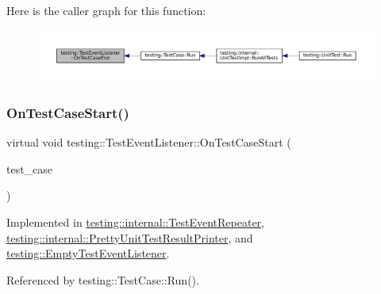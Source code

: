Here is the caller graph for this function\+:
\nopagebreak
\begin{figure}[H]
\begin{center}
\leavevmode
\includegraphics[width=350pt]{classtesting_1_1TestEventListener_ae61985e2ef76ac78379b077be57a9c36_icgraph}
\end{center}
\end{figure}
\mbox{\label{classtesting_1_1TestEventListener_ab4ed885d63f5bbff8076c1329b3dfe36}} 
\subsubsection{\texorpdfstring{On\+Test\+Case\+Start()}{OnTestCaseStart()}}
{\footnotesize\ttfamily virtual void testing\+::\+Test\+Event\+Listener\+::\+On\+Test\+Case\+Start (\begin{DoxyParamCaption}\item[{const \hyperlink{classtesting_1_1TestCase}{Test\+Case} \&}]{test\+\_\+case }\end{DoxyParamCaption})\hspace{0.3cm}{\ttfamily [pure virtual]}}



Implemented in \hyperlink{classtesting_1_1internal_1_1TestEventRepeater_a70124c738caa338bcd723eb2a51c8b3e}{testing\+::internal\+::\+Test\+Event\+Repeater}, \hyperlink{classtesting_1_1internal_1_1PrettyUnitTestResultPrinter_adcb68c729565d4bcdf8418a52902c3de}{testing\+::internal\+::\+Pretty\+Unit\+Test\+Result\+Printer}, and \hyperlink{classtesting_1_1EmptyTestEventListener_ae4707ed9cc7ace5241bc8ccc4051209b}{testing\+::\+Empty\+Test\+Event\+Listener}.



Referenced by testing\+::\+Test\+Case\+::\+Run().

